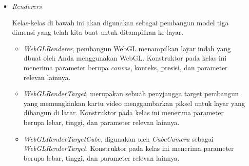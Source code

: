 \begin{itemize}
	\item \textit{Renderers}
	
	Kelas-kelas di bawah ini akan digunakan sebagai pembangun model tiga dimensi yang telah kita buat untuk ditampilkan ke layar.
	
	\begin{itemize}
		\item {\it WebGLRenderer}, pembangun WebGL menampilkan layar indah yang dbuat oleh Anda menggunakan WebGL. Konstruktor pada kelas ini menerima parameter berupa {\it canvas}, konteks, presisi, dan parameter relevan lainnya.
		\item {\it WebGLRenderTarget}, merupakan sebuah penyjangga target pembangun yang memungkinkan kartu video menggambarkan piksel untuk layar yang dibangun di latar. Konstruktor pada kelas ini menerima parameter berupa lebar, tinggi, dan parameter relevan lainnya.
		\item {\it WebGLRenderTargetCube}, digunakan oleh {\it CubeCamera} sebagai {\it WebGLRenderTarget}. Konstruktor pada kelas ini menerima parameter berupa lebar, tinggi, dan parameter relevan lainnya.
	\end{itemize}
	
\end{itemize}

